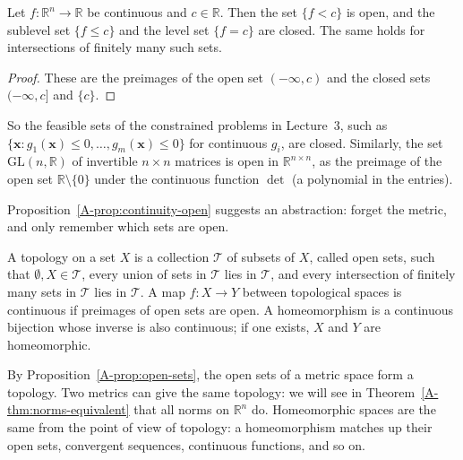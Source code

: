 \begin{corollary}\label{A-cor:level-sets-closed}
    Let $f: \mathbb{R}^n \to \mathbb{R}$ be continuous and $c \in \mathbb{R}$. Then the set $\{f < c\}$ is open, and the sublevel set $\{f \leq c\}$ and the level set $\{f = c\}$ are closed. The same holds for intersections of finitely many such sets.
\end{corollary}

\begin{proof}
    These are the preimages of the open set $(-\infty, c)$ and the closed sets $(-\infty, c]$ and $\{c\}$.
\end{proof}

So the feasible sets of the constrained problems in Lecture~3, such as $\{\mathbf{x} : g_1(\mathbf{x}) \leq 0, \ldots, g_m(\mathbf{x}) \leq 0\}$ for continuous $g_i$, are closed. Similarly, the set $\mathrm{GL}(n, \mathbb{R})$ of invertible $n \times n$ matrices is open in $\mathbb{R}^{n \times n}$, as the preimage of the open set $\mathbb{R} \setminus \{0\}$ under the continuous function $\det$ (a polynomial in the entries).

Proposition~\ref{A-prop:continuity-open} suggests an abstraction: forget the metric, and only remember which sets are open.

\begin{definition}\label{A-def:topology}
    A topology on a set $X$ is a collection $\mathcal{T}$ of subsets of $X$, called open sets, such that $\emptyset, X \in \mathcal{T}$, every union of sets in $\mathcal{T}$ lies in $\mathcal{T}$, and every intersection of finitely many sets in $\mathcal{T}$ lies in $\mathcal{T}$. A map $f: X \to Y$ between topological spaces is continuous if preimages of open sets are open. A homeomorphism is a continuous bijection whose inverse is also continuous; if one exists, $X$ and $Y$ are homeomorphic.
\end{definition}

By Proposition~\ref{A-prop:open-sets}, the open sets of a metric space form a topology. Two metrics can give the same topology: we will see in Theorem~\ref{A-thm:norms-equivalent} that all norms on $\mathbb{R}^n$ do. Homeomorphic spaces are the same from the point of view of topology: a homeomorphism matches up their open sets, convergent sequences, continuous functions, and so on.

